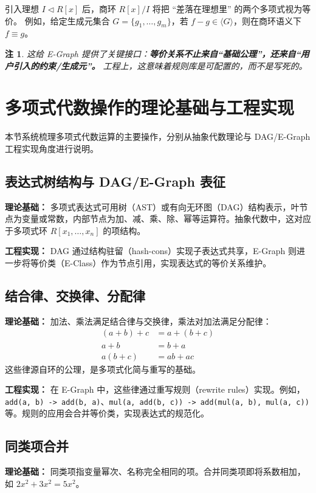 \documentclass[12pt,openany]{book}
\newtheorem{remark}{注}[chapter]
\begin{document}
引入理想 $I\triangleleft R[x]$ 后，商环 $R[x]/I$ 将把 ``差落在理想里'' 的两个多项式视为等价。
例如，给定生成元集合 $G=\{g_1,\dots,g_m\}$，若 $f-g\in\langle G\rangle$，则在商环语义下 $f\equiv g$。

\begin{remark}
这给 E-Graph 提供了关键接口：\textbf{等价关系不止来自“基础公理”，还来自“用户引入的约束/生成元”。}
工程上，这意味着规则库是可配置的，而不是写死的。
\end{remark}

\section{多项式代数操作的理论基础与工程实现}

本节系统梳理多项式代数运算的主要操作，分别从抽象代数理论与 DAG/E-Graph 工程实现角度进行说明。

\subsection{表达式树结构与 DAG/E-Graph 表征}


  	\textbf{理论基础：} 多项式表达式可用树（AST）或有向无环图（DAG）结构表示，叶节点为变量或常数，内部节点为加、减、乘、除、幂等运算符。抽象代数中，这对应于多项式环 $R[x_1,\dots,x_n]$ 的项结构。

  	\textbf{工程实现：} DAG 通过结构驻留（hash-cons）实现子表达式共享，E-Graph 则进一步将等价类（E-Class）作为节点引用，实现表达式的等价关系维护。

\subsection{结合律、交换律、分配律}
  	\textbf{理论基础：} 加法、乘法满足结合律与交换律，乘法对加法满足分配律：
\begin{align*}
  (a+b)+c &= a+(b+c) \\
  a+b &= b+a \\
  a(b+c) &= ab+ac
\end{align*}
这些律源自环的公理，是多项式化简与重写的基础。

    	\textbf{工程实现：} 在 E-Graph 中，这些律通过重写规则（rewrite rules）实现。例如，\texttt{add(a, b) -> add(b, a)}、\texttt{mul(a, add(b, c)) -> add(mul(a, b), mul(a, c))} 等。规则的应用会合并等价类，实现表达式的规范化。

\subsection{同类项合并}
  	\textbf{理论基础：} 同类项指变量幂次、名称完全相同的项。合并同类项即将系数相加，如 $2x^2 + 3x^2 = 5x^2$。
\end{document}
